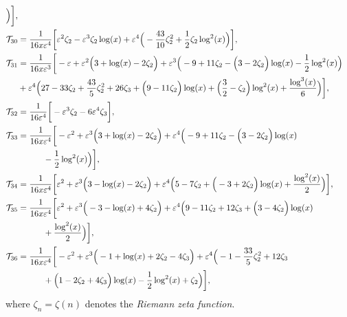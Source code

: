 \documentclass[final,1p,times]{elsarticle}
\begin{document}
\begin{align}
\Big)
% 
\bigg],
% 
\nonumber\\
% 
\mi_{30} &=   \frac{1}{16 x \ep^4}  \bigg[
% 
 \ep^2 \zeta_2
-\ep^3 \zeta_2 \log (x)
+\ep^4 \Big(
        -\frac{43}{10} \zeta_2^2
        +\frac{1}{2} \zeta_2 \log ^2(x)
\Big)
% 
\bigg],
%
\nonumber\\
% 
\mi_{31} &=   \frac{1}{16 x \ep^3}  \bigg[
% 
-\ep
+\ep^2 \Big(
        3
        +\log (x)
        -2 \zeta_2
\Big)
+\ep^3 \Big(
        -9
        +11 \zeta_2
        -\Big(
                 3
                -2 \zeta_2
        \Big) \log (x)
        -\frac{1}{2} \log ^2(x)
\Big)
\nonumber\\& 
+\ep^4 \Big(
        27
        -33 \zeta_2
        +\frac{43}{5} \zeta_2^2
        +26 \zeta_3
        +\Big(
                9
                -11 \zeta_2
        \Big) \log (x)
        +\Big(
                \frac{3}{2}
                -\zeta_2
        \Big) \log ^2(x)
        +\frac{\log ^3(x)}{6}
\Big)
% 
\bigg],
%
\nonumber\\
% 
\mi_{32} &=   \frac{1}{16 \ep^4}  \bigg[
% 
-\ep^3 \zeta_2
-6 \ep^4 \zeta_3
% 
\bigg],
%
\nonumber\\
% 
\mi_{33} &=   \frac{1}{16 x \ep^4}  \bigg[
% 
-\ep^2
+\ep^3 \Big(
        3
        +\log (x)
        -2 \zeta_2
\Big)
+\ep^4 \Big(
        -9
        +11 \zeta_2
        -\Big(
                 3
                -2 \zeta_2
        \Big) \log (x)
\nonumber\\& \qquad \quad        
        -\frac{1}{2} \log ^2(x)
\Big)
% 
\bigg],
%
\nonumber\\
% 
\mi_{34} &=   \frac{1}{16 x \ep^4}  \bigg[
% 
\ep^2
+\ep^3 \Big(
        3
        -\log (x)
        -2 \zeta_2
\Big)
+\ep^4 \Big(
        5
        -7 \zeta_2
        +\Big(
                -3
                +2 \zeta_2
        \Big) \log (x)
        +\frac{\log ^2(x)}{2}
\Big)
% 
\bigg],
%
\nonumber\\
% 
\mi_{35} &=   \frac{1}{16 x \ep^4}  \bigg[
% 
\ep^2
+\ep^3 \Big(
        -3
        -\log (x)
        +4 \zeta_2
\Big)
+\ep^4 \Big(
        9
        -11 \zeta_2
        +12 \zeta_3
        +\Big(
                3
                -4 \zeta_2
        \Big) \log (x)
\nonumber\\& \qquad \quad        
        +\frac{\log ^2(x)}{2}
\Big)
% 
\bigg],
%
\nonumber\\
% 
\mi_{36} &=   \frac{1}{16 x \ep^4}  \bigg[
% 
-\ep^2
+\ep^3 \Big(
        -1
        +\log (x)
        +2 \zeta_2
        -4 \zeta_3
\Big)
+\ep^4 \Big(
        -1
        -\frac{33}{5} \zeta_2^2
        +12 \zeta_3
\nonumber\\& \qquad \quad        
        +\Big(
                1
                -2 \zeta_2
                +4 \zeta_3
        \Big) \log (x)
        -\frac{1}{2} \log ^2(x)
        +\zeta_2
\Big)
% 
\bigg]\nonumber,
\end{align}
\endgroup
where $\zeta_n=\zeta(n)$ denotes the \textit{Riemann zeta function}.



\end{document}
